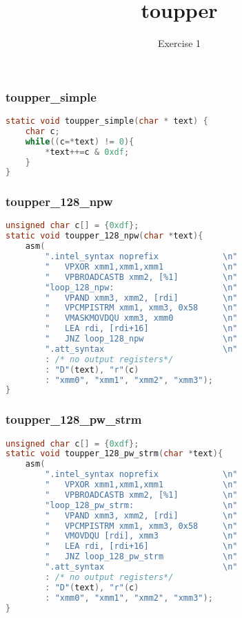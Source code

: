 \documentclass{beamer}
\title{toupper}
\subtitle{Exercise 1}
\author{\theauthor}
\date{\thedate}
\begin{document}
\frame{
	\titlepage
}


\begin{frame}[fragile]
  \frametitle{toupper\_simple}
  
\begin{lstlisting}[language=c,style=customc]
static void toupper_simple(char * text) {
    char c;
    while((c=*text) != 0){
        *text++=c & 0xdf;
    }
}
\end{lstlisting}
  
\end{frame}

\begin{frame}[fragile]
  \frametitle{toupper\_128\_npw}
  
\begin{lstlisting}[language=c,style=customc]
unsigned char c[] = {0xdf};
static void toupper_128_npw(char *text){
    asm(
        ".intel_syntax noprefix             \n" 
        "   VPXOR xmm1,xmm1,xmm1            \n"
        "   VPBROADCASTB xmm2, [%1]         \n" 
        "loop_128_npw:                      \n"
        "   VPAND xmm3, xmm2, [rdi]         \n" 
        "   VPCMPISTRM xmm1, xmm3, 0x58     \n" 
        "   VMASKMOVDQU xmm3, xmm0          \n" 
        "   LEA rdi, [rdi+16]               \n" 
        "   JNZ loop_128_npw                \n"
        ".att_syntax                        \n" 
        : /* no output registers*/
        : "D"(text), "r"(c)
        : "xmm0", "xmm1", "xmm2", "xmm3");
}
\end{lstlisting}
  
\end{frame}


\begin{frame}[fragile]
  \frametitle{toupper\_128\_pw\_strm}
  
\begin{lstlisting}[language=c,style=customc]
unsigned char c[] = {0xdf};
static void toupper_128_pw_strm(char *text){
    asm(
        ".intel_syntax noprefix             \n"
        "   VPXOR xmm1,xmm1,xmm1            \n"
        "   VPBROADCASTB xmm2, [%1]         \n"
        "loop_128_pw_strm:                  \n"
        "   VPAND xmm3, xmm2, [rdi]         \n"
        "   VPCMPISTRM xmm1, xmm3, 0x58     \n"
        "   VMOVDQU [rdi], xmm3             \n"
        "   LEA rdi, [rdi+16]               \n" 
        "   JNZ loop_128_pw_strm            \n"
        ".att_syntax                        \n"
        : /* no output registers*/
        : "D"(text), "r"(c)
        : "xmm0", "xmm1", "xmm2", "xmm3");
}
\end{lstlisting}
  
\end{frame}
\end{document}
